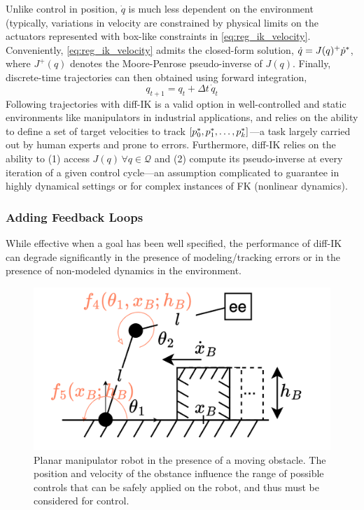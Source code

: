 Unlike control in position, \( \dot q \) is much less dependent on the environment (typically, variations in velocity are constrained by physical limits on the actuators represented with box-like constraints in \ref{eq:reg_ik_velocity}.
Conveniently, \ref{eq:reg_ik_velocity} admits the closed-form solution, \( \dot q = J(q)^+ \dot {p}^* \), where \( J^+(q) \) denotes the Moore-Penrose pseudo-inverse of \( J(q) \).
Finally, discrete-time trajectories can then obtained using forward integration,
\[
q_{t+1} = q_t + \Delta t\,\dot q_t
\]
Following trajectories with diff-IK is a valid option in well-controlled and static environments like manipulators in industrial applications, and relies on the ability to define a set of target velocities to track \( [p^*_0, p^*_1, \dots, p^*_k ] \)---a task largely carried out by human experts and prone to errors.
Furthermore, diff-IK relies on the ability to (1) access \( J(q) \, \forall q \in \mathcal Q \) and (2) compute its pseudo-inverse at every iteration of a given control cycle---an assumption complicated to guarantee in highly dynamical settings or for complex instances of FK (nonlinear dynamics).

\subsubsection{Adding Feedback Loops}
While effective when a goal has been well specified, the performance of diff-IK can degrade significantly in the presence of modeling/tracking errors or in the presence of non-modeled dynamics in the environment.

\begin{figure}
    \vspace{-\intextsep}
    \centering
    \includegraphics[width=\linewidth]{figures/ch2/ch2-planar-manipulator-floor-box.png}
    \caption{Planar manipulator robot in the presence of a moving obstacle. The position and velocity of the obstance influence the range of possible controls that can be safely applied on the robot, and thus must be considered for control.}
    \label{fig:planar-manipulator-box-velocity}
\end{figure}


